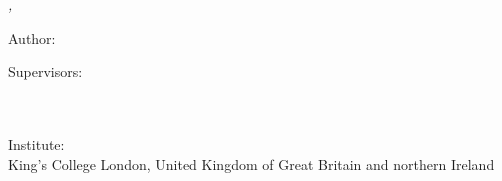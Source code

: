 \hfill
\vfill

\noindent \textit{\myTitle,} {\textcopyright} {\mySubmissionMonth} {\mySubmissionYear}

\bigskip

\noindent Author:\\
{\myFirstName} \textsc{\myLastName}

\medskip

\noindent Supervisors:\\
{\myProfTitle} {\myProfFirstName} \textsc{\myProfLastName}\\
{\mySecondProfTitle} {\mySecondProfFirstName} \textsc{\mySecondProfLastName}\\
{\myThirdProfTitle} {\myThirdProfFirstName} \textsc{\myThirdProfLastName}
\medskip

\noindent Institute:\\
King's College London, United Kingdom of Great Britain and northern Ireland
